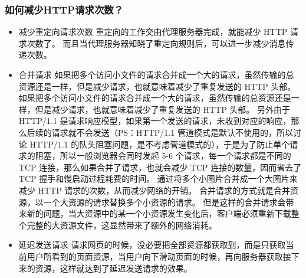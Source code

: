 \documentclass[11pt]{article}
\begin{document}
\subsubsection{如何减少HTTP请求次数？}
\label{sec:org1ee5bfc}
\begin{itemize}
\item 减少重定向请求次数
重定向的工作交由代理服务器完成，就能减少 HTTP 请求次数了。
而且当代理服务器知晓了重定向规则后，可以进一步减少消息传递次数。
\item 合并请求
如果把多个访问小文件的请求合并成一个大的请求，虽然传输的总资源还是一样，但是减少请求，也就意味着减少了重复发送的 HTTP 头部。如果把多个访问小文件的请求合并成一个大的请求，虽然传输的总资源还是一样，但是减少请求，也就意味着减少了重复发送的 HTTP 头部。
另外由于 HTTP/1.1 是请求响应模型，如果第一个发送的请求，未收到对应的响应，那么后续的请求就不会发送（PS：HTTP/1.1 管道模式是默认不使用的，所以讨论 HTTP/1.1 的队头阻塞问题，是不考虑管道模式的），于是为了防止单个请求的阻塞，所以一般浏览器会同时发起 5-6 个请求，每一个请求都是不同的 TCP 连接，那么如果合并了请求，也就会减少 TCP 连接的数量，因而省去了 TCP 握手和慢启动过程耗费的时间。
通过将多个小图片合并成一个大图片来减少 HTTP 请求的次数，从而减少网络的开销。
合并请求的方式就是合并资源，以一个大资源的请求替换多个小资源的请求。
但是这样的合并请求会带来新的问题，当大资源中的某一个小资源发生变化后，客户端必须重新下载整个完整的大资源文件，这显然带来了额外的网络消耗。
\item 延迟发送请求
请求网页的时候，没必要把全部资源都获取到，而是只获取当前用户所看到的页面资源，当用户向下滑动页面的时候，再向服务器获取接下来的资源，这样就达到了延迟发送请求的效果。
\end{itemize}
\end{document}

